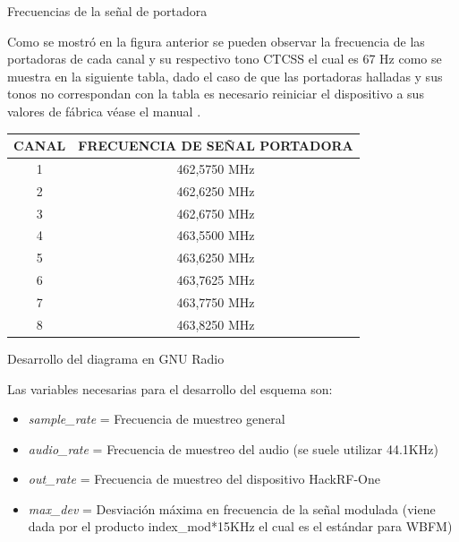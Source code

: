 \begin{frame}{Frecuencias de la señal de portadora}

Como se mostró en la figura anterior se pueden observar la frecuencia de las portadoras de cada canal y su respectivo tono CTCSS el cual es 67 Hz como se muestra en la siguiente tabla, dado el caso de que las portadoras halladas y sus tonos no correspondan con la tabla es necesario reiniciar el dispositivo a sus valores de fábrica véase el manual \cite{Motorola2010}.


\begin{table}[]
\scriptsize
\centering
\begin{tabular}{|c|c|}
\hline

\rowcolor{BlueGreen!20}
\textbf{CANAL} & \textbf{FRECUENCIA DE SEÑAL PORTADORA} \\ \hline
1              & 462,5750 MHz                           \\ \hline
2              & 462,6250 MHz                           \\ \hline
3              & 462,6750 MHz                           \\ \hline
4              & 463,5500 MHz                           \\ \hline
5              & 463,6250 MHz                           \\ \hline
6              & 463,7625 MHz                           \\ \hline
7              & 463,7750 MHz                           \\ \hline
8              & 463,8250 MHz                           \\ \hline
\end{tabular}
\end{table}

\end{frame}

\begin{frame}{Desarrollo del diagrama en GNU Radio}

Las variables necesarias para el desarrollo del esquema son:
\begin{itemize}
    \item {\textit{sample\_rate} = Frecuencia de muestreo general}
    \item {\textit{audio\_rate} = Frecuencia de muestreo del audio (se suele utilizar 44.1KHz)}
    \item {\textit{out\_rate} = Frecuencia de muestreo del dispositivo HackRF-One}
    \item {\textit{max\_dev} = Desviación máxima en frecuencia de la señal modulada (viene dada por el producto index\_mod*15KHz el cual es el estándar para WBFM)}
    
\end{itemize}{}

\end{frame}

